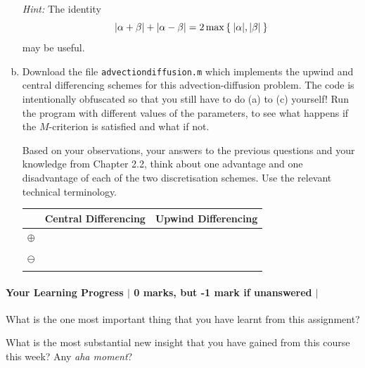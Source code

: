 \documentclass[10pt,letterpaper]{scrartcl}
\begin{document}
\begin{enumerate}[(a)]
\emph{Hint:} The identity
\begin{equation*}
\lvert \alpha + \beta \rvert + \lvert \alpha - \beta \rvert = 2\max\Set{\lvert \alpha \rvert,\lvert \beta \rvert}
\end{equation*}
may be useful.

\vfill

\newpage

\mbox{}

\newpage

\item Download the file \texttt{advection\textunderscore diffusion.m} which implements the upwind and central differencing schemes for this advection-diffusion problem. The code is intentionally obfuscated so that you still have to do (a) to (c) yourself!  Run the program with different values of the parameters, to see what happens if the $M$-criterion is satisfied and what if not.

Based on your observations, your answers to the previous questions and your knowledge from Chapter 2.2, think about one advantage and one disadvantage of each of the two discretisation schemes. Use the relevant technical terminology.

\begin{center}
\begin{tabular}{lcc}
\toprule
& Central Differencing & Upwind Differencing\\
\toprule
$\oplus$ \\
&  \phantom{\rule{7cm}{3cm}} & \phantom{\rule{7cm}{3cm}}\\
\midrule
$\ominus$ & \\
& \phantom{\rule{7cm}{3cm}} & \phantom{\rule{7cm}{3cm}}\\
\bottomrule
\end{tabular}
\end{center}

\end{enumerate}

\paragraph*{Your Learning Progress $\vert$ 0 marks, but -1 mark if unanswered $\vert$ \faFilePdfO}
What is the one most important thing that you have learnt from this assignment?

\vspace*{3mm}
\hrulefill

\vspace*{3mm}
\hrulefill

\vspace*{3mm}
\hrulefill

What is the most substantial new insight that you have gained from this course this week? Any \emph{aha moment}?

\vspace*{3mm}
\hrulefill

\vspace*{3mm}
\hrulefill

\vspace*{3mm}
\hrulefill
\end{document}

